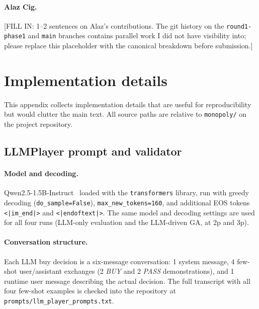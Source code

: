 \documentclass[10pt]{article}
\begin{document}
\paragraph{Alaz Cig.} %
[FILL IN: 1--2 sentences on Alaz's contributions. The git history
on the \texttt{round1-phase1} and \texttt{main} branches contains
parallel work I did not have visibility into; please replace this
placeholder with the canonical breakdown before submission.]

\appendix

\section{Implementation details}\label{app:impl}

This appendix collects implementation details that are useful for
reproducibility but would clutter the main text. All source paths
are relative to \texttt{monopoly/} on the project repository.

\subsection{LLMPlayer prompt and validator}\label{app:llm}

\paragraph{Model and decoding.} Qwen2.5-1.5B-Instruct~\cite{qwen25}
loaded with the \texttt{transformers} library, run with greedy
decoding (\texttt{do\_sample=False}), \texttt{max\_new\_tokens=160},
and additional EOS tokens \texttt{<|im\_end|>} and
\texttt{<|endoftext|>}. The same model and decoding settings are
used for all four runs (LLM-only evaluation and the LLM-driven GA, at 2p
and 3p).

\paragraph{Conversation structure.} Each LLM buy decision is a
six-message conversation: 1 system message, 4 few-shot
user/assistant exchanges (2 \emph{BUY} and 2 \emph{PASS}
demonstrations), and 1 runtime user message describing the actual
decision. The full transcript with all four few-shot examples is
checked into the repository at
\texttt{prompts/llm\_player\_prompts.txt}.
\end{document}
